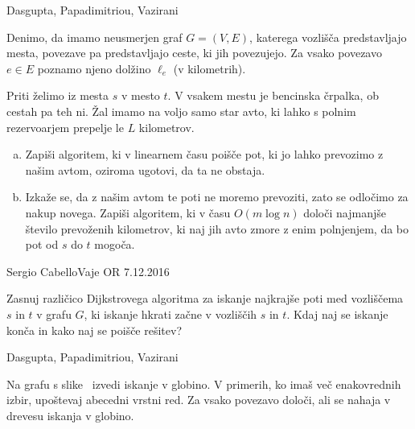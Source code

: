 \begin{naloga}%
{Dasgupta, Papadimitriou, Vazirani}{\cite[Exercise~4.13]{dpv}}
\begin{vprasanje}
Denimo, da imamo neusmerjen graf $G = (V, E)$,
katerega vozlišča pred\-stav\-lja\-jo mesta,
povezave pa predstavljajo ceste, ki jih povezujejo.
Za vsako povezavo $e \in E$ poznamo njeno dolžino $\ell_e$ (v kilometrih).

Priti želimo iz mesta $s$ v mesto $t$.
V vsakem mestu je bencinska črpalka, ob cestah pa teh ni.
Žal imamo na voljo samo star avto,
ki lahko s polnim rezervoarjem prepelje le $L$ kilometrov.
\begin{enumerate}[(a)]
\item Zapiši algoritem, ki v linearnem času poišče pot,
ki jo lahko prevozimo z našim avtom,
oziroma ugotovi, da ta ne obstaja.
\item Izkaže se, da z našim avtom te poti ne moremo prevoziti,
zato se odločimo za nakup novega.
Zapiši algoritem, ki v času $O(m \log n)$
določi najmanjše število prevoženih kilometrov,
ki naj jih avto zmore z enim polnjenjem,
da bo pot od $s$ do $t$ mogoča.
\end{enumerate}

\end{vprasanje}
\begin{odgovor}
\end{odgovor}
\end{naloga}


\begin{naloga}{Sergio Cabello}{Vaje OR 7.12.2016}
\begin{vprasanje}
Zasnuj različico Dijkstrovega algoritma
za iskanje najkrajše poti med vozliščema $s$ in $t$ v grafu $G$,
ki iskanje hkrati začne v vozliščih $s$ in $t$.
Kdaj naj se iskanje konča in kako naj se poišče rešitev?
\end{vprasanje}
\begin{odgovor}
\end{odgovor}
\end{naloga}


\begin{naloga}%
{Dasgupta, Papadimitriou, Vazirani}{\cite[Exercise~3.1]{dpv}}
\begin{vprasanje}[dfs]
Na grafu s slike~ izvedi iskanje v globino.
V primerih, ko imaš več ena\-ko\-vred\-nih izbir,
upoštevaj abecedni vrstni red.
Za vsako povezavo določi, ali se nahaja v drevesu iskanja v globino.
\end{vprasanje}
\begin{odgovor}
\end{odgovor}
\end{naloga}


